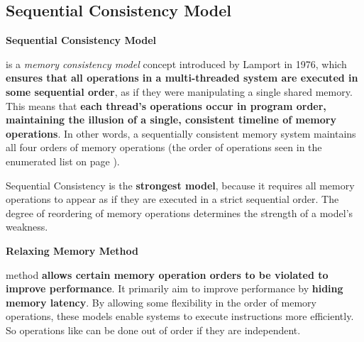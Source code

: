 \subsection{Sequential Consistency Model}\label{subsection: Sequential Consistency Model}

\begin{flushleft}
    \textcolor{Green3}{ \textbf{Sequential Consistency Model}}
\end{flushleft}
 is a \emph{memory consistency model} concept introduced by Lamport in 1976, which \textbf{ensures that all operations in a multi-threaded system are executed in some sequential order}, as if they were manipulating a single shared memory. This means that \textbf{each thread's operations occur in program order, maintaining the illusion of a single, consistent timeline of memory operations}. In other words, a sequentially consistent memory system maintains all four orders of memory operations (the order of operations seen in the enumerated list on page ).

\highspace
Sequential Consistency is the \textbf{strongest model}, because it requires all memory operations to appear as if they are executed in a strict sequential order. The degree of reordering of memory operations determines the strength of a model's weakness.

\highspace
\begin{flushleft}
    \textcolor{Green3}{ \textbf{Relaxing Memory Method}}
\end{flushleft}
 method \textbf{allows certain memory operation orders to be violated to improve performance}. It primarily aim to improve performance by \textbf{hiding memory latency}. By allowing some flexibility in the order of memory operations, these models enable systems to execute instructions more efficiently. So operations like  can be done out of order if they are independent.

